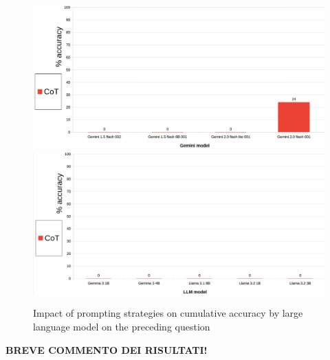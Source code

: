 \documentclass[12pt]{article}
\begin{document}
\begin{figure}[H]
    \centering
            \includegraphics[width=1\textwidth]{q307Gemini.png}
            \includegraphics[width=1\textwidth]{q307Other.png}
    \caption[Accuracy on Question 19 by LLM]{Impact of prompting strategies on cumulative accuracy by large language model on the preceding question}
    \end{figure} 
\textbf{BREVE COMMENTO DEI RISULTATI!}

\vspace{1cm}

\end{document}
